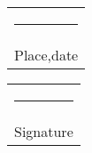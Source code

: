    \vspace*{4em}\noindent
    \hfill%
    \begin{tabular}[t]{c}
      \rule{10em}{0.4pt}\\ Place,date
    \end{tabular}%
    \hfill%
    \begin{tabular}[t]{c}
      \rule{10em}{0.4pt}\\ Signature
    \end{tabular}%
    \hfill\strut
    